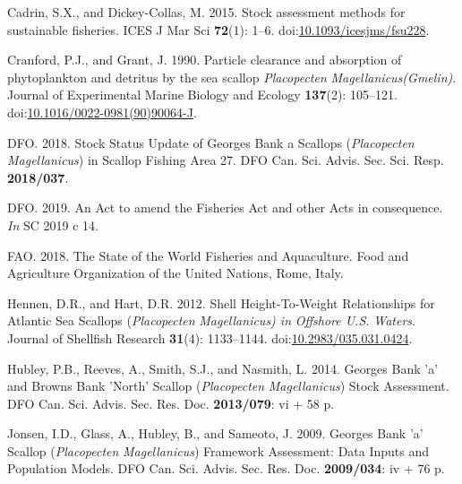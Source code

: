 \documentclass[
]{article}
\newlength{\cslhangindent}
\newlength{\cslentryspacingunit} %
\newenvironment{CSLReferences}[2] %
 {%
  \setlength{\parindent}{0pt}
  \ifodd #1
  \let\oldpar\par
  \def\par{\hangindent=\cslhangindent\oldpar}
  \fi
  \setlength{\parskip}{#2\cslentryspacingunit}
 }%
 {}
\begin{document}
\hypertarget{refs}{}
\begin{CSLReferences}{1}{0}
\leavevmode{}%
Cadrin, S.X., and Dickey-Collas, M. 2015. Stock assessment methods for sustainable fisheries. ICES J Mar Sci \textbf{72}(1): 1--6. doi:\href{https://doi.org/10.1093/icesjms/fsu228}{10.1093/icesjms/fsu228}.

\leavevmode{}%
Cranford, P.J., and Grant, J. 1990. Particle clearance and absorption of phytoplankton and detritus by the sea scallop {\emph{Placopecten}}{ \emph{Magellanicus}}{\emph{\emph{(}}}{\emph{\emph{Gmelin}}}{\emph{\emph{)}}}. Journal of Experimental Marine Biology and Ecology \textbf{137}(2): 105--121. doi:\href{https://doi.org/10.1016/0022-0981(90)90064-J}{10.1016/0022-0981(90)90064-J}.

\leavevmode{}%
DFO. 2018. Stock {Status Update} of {Georges Bank} a {Scallops} ({\emph{Placopecten}}{ \emph{Magellanicus}}) in {Scallop Fishing Area} 27. DFO Can. Sci. Advis. Sec. Sci. Resp. \textbf{2018/037}.

\leavevmode{}%
DFO. 2019. An {Act} to amend the {Fisheries Act} and other {Acts} in consequence. \emph{In} SC 2019 c 14.

\leavevmode{}%
FAO. 2018. The {State} of the {World Fisheries} and {Aquaculture}. {Food and Agriculture Organization of the United Nations}, {Rome, Italy}.

\leavevmode{}%
Hennen, D.R., and Hart, D.R. 2012. Shell {Height-To-Weight Relationships} for {Atlantic Sea Scallops} ({\emph{Placopecten}}{ \emph{Magellanicus}}{\emph{\emph{) in}} }{\emph{\emph{Offshore U}}}{\emph{\emph{.}}}{\emph{\emph{S}}}{\emph{\emph{.}} }{\emph{\emph{Waters}}}. Journal of Shellfish Research \textbf{31}(4): 1133--1144. doi:\href{https://doi.org/10.2983/035.031.0424}{10.2983/035.031.0424}.

\leavevmode{}%
Hubley, P.B., Reeves, A., Smith, S.J., and Nasmith, L. 2014. Georges {Bank} 'a' and {Browns Bank} '{North}' {Scallop} ({\emph{Placopecten}}{ \emph{Magellanicus}}) {Stock Assessment}. DFO Can. Sci. Advis. Sec. Res. Doc. \textbf{2013/079}: vi + 58 p.

\leavevmode{}%
Jonsen, I.D., Glass, A., Hubley, B., and Sameoto, J. 2009. Georges {Bank} 'a' {Scallop} ({\emph{Placopecten}}{ \emph{Magellanicus}}) {Framework Assessment}: {Data Inputs} and {Population Models}. DFO Can. Sci. Advis. Sec. Res. Doc. \textbf{2009/034}: iv + 76 p.


\end{CSLReferences}
\end{document}
